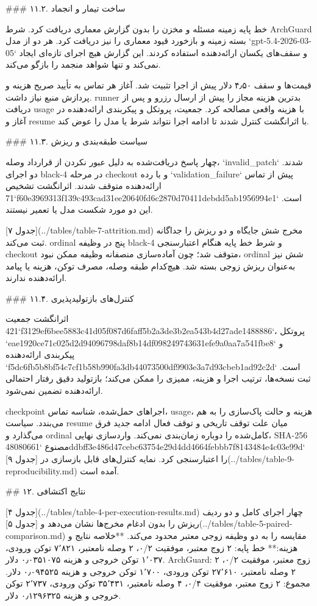 \documentclass[11pt,a4paper]{article}
\begin{document}
\#\#\# ۱۱.۲. ساخت تیمار و انجماد

خط پایه زمینه مسئله و مخزن را بدون گزارش معماری دریافت کرد. شرط ArchGuard بسته زمینه و بازخورد قیود
معماری را نیز دریافت کرد. هر دو از مدل `gpt-5.4-2026-03-05` و سقف‌های یکسان ارائه‌دهنده استفاده کردند.
این گزارش هیچ اجرای تازه‌ای ایجاد نمی‌کند و تنها شواهد منجمد را بازگو می‌کند.

قیمت‌ها و سقف ۴٫۵۰ دلار پیش از اجرا تثبیت شد. آغاز هر تماس به تأیید صریح هزینه و پردازش منبع نیاز
داشت. runner بدترین هزینه مجاز را پیش از ارسال رزرو و پس از دریافت usage با هزینه واقعی مصالحه کرد.
جمعیت، پروتکل و پیکربندی ارائه‌دهنده در آغاز و resume با اثرانگشت کنترل شدند تا ادامه اجرا نتواند شرط
یا مدل را عوض کند.

\#\#\# ۱۱.۳. سیاست طبقه‌بندی و ریزش

چهار پاسخ دریافت‌شده به دلیل عبور نکردن از قرارداد وصله، `invalid_patch` شدند. دو اجرای black-4 در
مرحله checkout و با رده `validation_failure` پیش از تماس ارائه‌دهنده متوقف شدند. اثرانگشت تشخیص
`71f60e3969313f139c493cad31ee20640fd6c2870d70411debdd5ab1956994e1` است. این دو مورد شکست مدل یا
تعمیر نیستند.

[جدول ۷](../tables/table-7-attrition.md) مخرج شش جایگاه و دو ریزش را جداگانه ثبت می‌کند. ordinal پنج
در وظیفه black-4 و شرط خط پایه هنگام اعتبارسنجی checkout متوقف شد؛ چون آماده‌سازی منصفانه وظیفه ممکن
نبود، ordinal شش نیز به‌عنوان ریزش زوجی بسته شد. هیچ‌کدام طبقه وصله، مصرف توکن، هزینه یا پیامد
ارائه‌دهنده ندارند.

\#\#\# ۱۱.۴. کنترل‌های بازتولیدپذیری

اثرانگشت جمعیت `421f3129ef6bee5883c41d05f087d6faff5b2a3de3b2ea543b4d27ade1488886`، پروتکل
`eae1920ce71c025d2d94096798daf8b14df098249743631efe9a0aa7a541fbe8` و پیکربندی ارائه‌دهنده
`f5dc6fb5b8bf54c7cf1b58b990fa3db44073500df9903e3a7d93cbeb1ad92c2d` است. ثبت نسخه‌ها، ترتیب
اجرا و هزینه، ممیزی را ممکن می‌کند؛ بازتولید دقیق رفتار احتمالی ارائه‌دهنده تضمین نمی‌شود.

checkpoint اجراهای حمل‌شده، شناسه تماس، usage، هزینه و حالت پاک‌سازی را به هم می‌بندد. سیاست resume
میان علت توقف تاریخی و توقف فعال ادامه جدید فرق می‌گذارد و ordinal کامل‌شده را دوباره زمان‌بندی
نمی‌کند. واردسازی نهایی، SHA-256 مصنوع
`48080661ddbff3e486d47cebc63754e29d4dd4664febbb7f8143484e4c03e99d` را اعتبارسنجی کرد. نمایه
کنترل‌های قابل بازسازی در [جدول ۹](../tables/table-9-reproducibility.md) آمده است.

\#\# ۱۲. نتایج اکتشافی

[جدول ۴](../tables/table-4-per-execution-results.md) چهار اجرای کامل و دو ردیف ریزش را بدون ادغام
مخرج‌ها نشان می‌دهد و [جدول ۵](../tables/table-5-paired-comparison.md) مقایسه را به دو وظیفه زوجی معتبر
محدود می‌کند. **خلاصه نتایج و هزینه:** خط پایه: ۲ زوج معتبر، موفقیت ۰/۲، ۲ وصله نامعتبر،
۷٬۸۲۱ توکن ورودی، ۱٬۰۳۷ توکن خروجی و هزینه ۰٫۰۳۵۱۰۷۵ دلار. ArchGuard: ۲ زوج معتبر،
موفقیت ۰/۲، ۲ وصله نامعتبر، ۲۷٬۶۱۰ توکن ورودی، ۱٬۷۰۰ توکن خروجی و هزینه ۰٫۰۹۴۵۲۵ دلار.
مجموع: ۲ زوج معتبر، موفقیت ۰/۴، ۴ وصله نامعتبر، ۳۵٬۴۳۱ توکن ورودی، ۲٬۷۳۷ توکن
خروجی و هزینه ۰٫۱۲۹۶۳۲۵ دلار.
\end{document}
